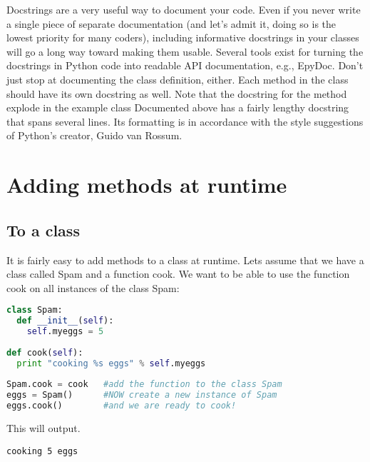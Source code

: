 Docstrings are a very useful way to document your code. Even if you never write
a single piece of separate documentation (and let's admit it, doing so is the
lowest priority for many coders), including informative docstrings in your
classes will go a long way toward making them usable.  Several tools exist for
turning the docstrings in Python code into readable API documentation, e.g.,
EpyDoc.  Don't just stop at documenting the class definition, either. Each
method in the class should have its own docstring as well. Note that the
docstring for the method explode in the example class Documented above has a
fairly lengthy docstring that spans several lines. Its formatting is in
accordance with the style suggestions of Python's creator, Guido van Rossum.

\section{Adding methods at runtime}
\subsection{To a class}
It is fairly easy to add methods to a class at runtime. Lets assume that we have
a class called Spam and a function cook. We want to be able to use the function
cook on all instances of the class Spam:
\lstset{basicstyle=\scriptsize, numbers=left, captionpos=b, tabsize=4}
\begin{lstlisting}[caption=Reflection,language={Python},
xleftmargin=15pt, label=lst:reflection]
class Spam:
  def __init__(self):
    self.myeggs = 5
 
def cook(self):
  print "cooking %s eggs" % self.myeggs
 
Spam.cook = cook   #add the function to the class Spam
eggs = Spam()      #NOW create a new instance of Spam
eggs.cook()        #and we are ready to cook!
\end{lstlisting}

This will output.
\scriptsize
\begin{verbatim}
cooking 5 eggs
\end{verbatim}
\normalsize

